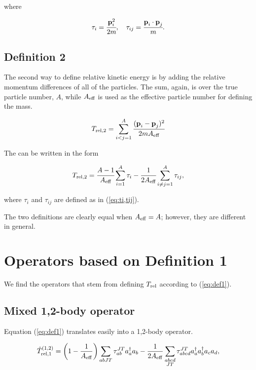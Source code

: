 \documentclass{article}
\begin{document}
where

\begin{equation}\label{eq:ti,tij}
  \tau_i = \cfrac{\textbf{p}_i^2}{2m}, \quad
  \tau_{ij} = \cfrac{\textbf{p}_i\cdot\textbf{p}_j}{m}.
\end{equation}

\subsection{Definition 2}

The second way to define relative kinetic energy is by adding the
relative momentum differences of all of the particles. The sum, again,
is over the true particle number, $A$, while $A_{\rm{eff}}$ is used as
the effective particle number for defining the mass.

\begin{equation*}
  T_{\rm{rel},2}= \displaystyle\sum_{i<j=1}^A
  \cfrac{(\textbf{p}_i-\textbf{p}_j)^2}{2mA_{\rm{eff}}}
\end{equation*}

The can be written in the form

\begin{equation}\label{eq:def2}
  T_{\rm{rel},2}= \cfrac{A-1}{A_{\rm{eff}}} \displaystyle\sum_{i=1}^A\tau_i
  - \cfrac{1}{2A_{\rm{eff}}} \displaystyle\sum_{i\neq j=1}^A\tau_{ij},
\end{equation}

where $\tau_i$ and $\tau_{ij}$ are defined as in (\ref{eq:ti,tij}).

The two definitions are clearly equal when $A_{\rm{eff}}=A$; however,
they are different in general.

\section{Operators based on Definition 1}

We find the operators that stem from defining $T_{\rm{rel}}$ according
to (\ref{eq:def1}).

\subsection{Mixed 1,2-body operator}

Equation (\ref{eq:def1}) translates easily into a 1,2-body operator.

\begin{equation}\label{eq:def1op1,2}
  \hat{T}_{\rm{rel},1}^{(1,2)} = \left(1-\frac{1}{A_{\rm{eff}}}\right)
  \displaystyle\sum_{abJT}\tau_{ab}^{JT}a_a^{\dagger}a_b
  -\frac{1}{2A_{\rm{eff}}} \displaystyle\sum_{\substack{abcd\\JT}}
  \tau_{abcd}^{JT}a_a^{\dagger}a_b^{\dagger}a_ca_d,
\end{equation}
\end{document}
